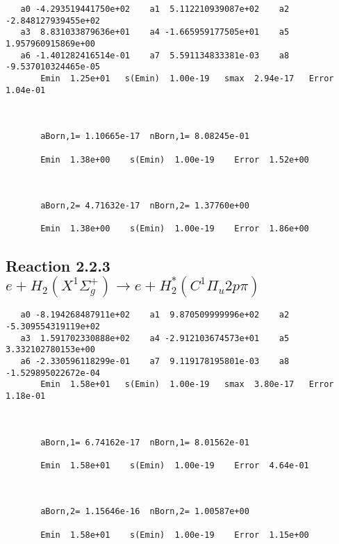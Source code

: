 \documentclass[12pt]{article}
\begin{document}
\begin{small}\begin{verbatim}
   a0 -4.293519441750e+02    a1  5.112210939087e+02    a2 -2.848127939455e+02
   a3  8.831033879636e+01    a4 -1.665959177505e+01    a5  1.957960915869e+00
   a6 -1.401282416514e-01    a7  5.591134833381e-03    a8 -9.537010324465e-05
       Emin  1.25e+01   s(Emin)  1.00e-19   smax  2.94e-17   Error  1.04e-01



       aBorn,1= 1.10665e-17  nBorn,1= 8.08245e-01

       Emin  1.38e+00    s(Emin)  1.00e-19    Error  1.52e+00



       aBorn,2= 4.71632e-17  nBorn,2= 1.37760e+00

       Emin  1.38e+00    s(Emin)  1.00e-19    Error  1.86e+00
\end{verbatim}\end{small}





\newpage
\subsection{
Reaction 2.2.3 $e + H_2(X^1\Sigma_g^+) \rightarrow e + H_2^*(C^1\Pi_u2p\pi) $}














\begin{small}\begin{verbatim}
   a0 -8.194268487911e+02    a1  9.870509999996e+02    a2 -5.309554319119e+02
   a3  1.591702330888e+02    a4 -2.912103674573e+01    a5  3.332102780153e+00
   a6 -2.330596118299e-01    a7  9.119178195801e-03    a8 -1.529895022672e-04
       Emin  1.58e+01   s(Emin)  1.00e-19   smax  3.80e-17   Error  1.18e-01



       aBorn,1= 6.74162e-17  nBorn,1= 8.01562e-01

       Emin  1.58e+01    s(Emin)  1.00e-19    Error  4.64e-01



       aBorn,2= 1.15646e-16  nBorn,2= 1.00587e+00

       Emin  1.58e+01    s(Emin)  1.00e-19    Error  1.15e+00
\end{verbatim}\end{small}
\end{document}
